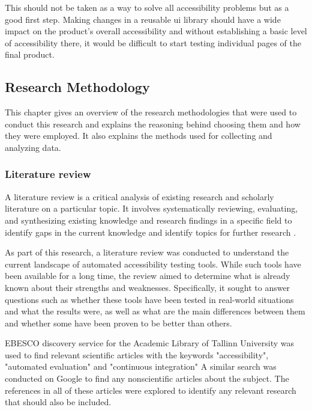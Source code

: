 \documentclass{master_thesis}
\begin{document}
This should not be taken as a way to solve all accessibility problems but as a good first step. Making changes in a reusable \ac{ui} library should have a wide impact on the product's overall accessibility and without establishing a basic level of accessibility there, it would be difficult to start testing individual pages of the final product.
\flushbottom
\subsection{Research Methodology}


This chapter gives an overview of the research methodologies that were used to conduct this research and explains the reasoning behind choosing them and how they were employed. It also explains the methods used for collecting and analyzing data.

\subsubsection{Literature review}

A literature review is a critical analysis of existing research and scholarly literature on a particular topic. It involves systematically reviewing, evaluating, and synthesizing existing knowledge and research findings in a specific field to identify gaps in the current knowledge and identify topics for further research \citep{Luft2022}.

As part of this research, a literature review was conducted to understand the current landscape of automated accessibility testing tools. While such tools have been available for a long time, the review aimed to determine what is already known about their strengths and weaknesses. Specifically, it sought to answer questions such as whether these tools have been tested in real-world situations and what the results were, as well as what are the main differences between them and whether some have been proven to be better than others.

EBESCO discovery service for the Academic Library of Tallinn University was used to find relevant scientific articles with the keywords "accessibility", "automated evaluation" and "continuous integration" A similar search was conducted on Google to find any nonscientific articles about the subject. The references in all of these articles were explored to identify any relevant research that should also be included.
\end{document}
